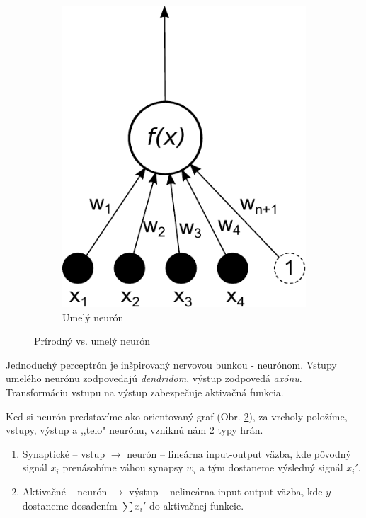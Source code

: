 \begin{figure}[hp]
\begin{center}
\begin{subfigure}[b]{0.3\textwidth}
 	  \includegraphics[width=\textwidth]{images/neuron}
 	  \caption{Umelý neurón}
 	    \label{fig:neuron}
    \end{subfigure}
  \end{center}%
  \caption{Prírodný vs. umelý neurón}
\end{figure}

Jednoduchý perceptrón je inšpirovaný nervovou bunkou - neurónom. Vstupy umelého neurónu zodpovedajú \textit{dendridom}, výstup zodpovedá \textit{axónu}. 
Transformáciu vstupu na výstup zabezpečuje aktivačná funkcia.

Keď si neurón predstavíme ako orientovaný graf (Obr. \ref{fig:neuron}), za vrcholy položíme, vstupy, výstup a ,,telo" neurónu, vzniknú nám 2 typy hrán.
\begin{enumerate}
\item Synaptické -- vstup $\rightarrow$ neurón -- lineárna input-output väzba, kde pôvodný signál $x_i$ prenásobíme váhou synapsy $w_i$ a tým dostaneme výsledný signál $x_i'$.

\item Aktivačné -- neurón $\rightarrow$ výstup -- nelineárna input-output väzba, kde $y$ dostaneme dosadením $\sum x_i'$ do aktivačnej funkcie.
\end{enumerate}

